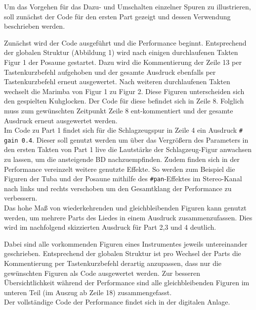 \documentclass[
10pt, %
a4paper, %
oneside, %
headinclude,footinclude, %
BCOR5mm, %
]{scrartcl}
\begin{document}
\noindent Um das Vorgehen für das Dazu- und Umschalten einzelner Spuren zu illustrieren, soll zunächst der Code für den ersten Part gezeigt und dessen Verwendung beschrieben werden.

\lstset{
	numbers=left,
}


\noindent Zunächst wird der Code ausgeführt und die Performance beginnt.
Entsprechend der globalen Struktur (Abbildung 1) wird nach einigen durchlaufenen Takten Figur 1 der Posaune gestartet. Dazu wird die Kommentierung der Zeile 13 per Tastenkurzbefehl aufgehoben und der gesamte Ausdruck ebenfalls per Tastenkurzbefehl erneut ausgewertet. Nach weiteren durchlaufenen Takten wechselt die Marimba von Figur 1 zu Figur 2. Diese Figuren unterscheiden sich den gespielten Kuhglocken. Der Code für diese befindet sich in Zeile 8. Folglich muss zum gewünschten Zeitpunkt Zeile 8 ent-kommentiert und der gesamte Ausdruck erneut ausgewertet werden.\\
Im Code zu Part 1 findet sich für die Schlagzeugspur in Zeile 4 ein Ausdruck \verb|# gain 0.4|. Dieser soll genutzt werden um über das Vergrößern des Parameters in den ersten Takten von Part 1 live die Lautstärke der Schlagzeug-Figur anwachsen zu lassen, um die ansteigende BD nachzuempfinden. Zudem finden sich in der Performance vereinzelt weitere genutzte Effekte. So werden zum Beispiel die Figuren der Tuba und der Posaune mithilfe des \verb|#pan|-Effektes\cite{tid15} im Stereo-Kanal nach links und rechts verschoben um den Gesamtklang der Performance zu verbessern.\\

\noindent Das hohe Maß von wiederkehrenden und gleichbleibenden Figuren kann genutzt werden, um mehrere Parts des Liedes in einem Ausdruck zusammenzufassen. Dies wird im nachfolgend skizzierten Ausdruck für Part 2,3 und 4 deutlich. 


\lstset{
	numbers=none,
}

\noindent Dabei sind alle vorkommenden Figuren eines Instrumentes jeweils untereinander geschrieben. Entsprechend der globalen Struktur ist pro Wechsel der Parts die Kommentierung per Tastenkurzbefehl derartig anzupassen, dass nur die gewünschten Figuren als Code ausgewertet werden. Zur besseren Übersichtlichkeit während der Performance sind alle gleichbleibenden Figuren im unteren Teil (im Auszug ab Zeile 18) zusammengefasst.\\

\noindent Der vollständige Code der Performance findet sich in der digitalen Anlage.
\end{document}
